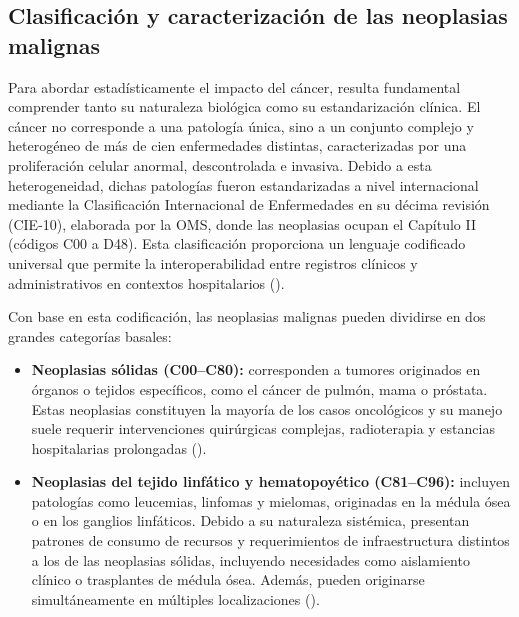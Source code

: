 

\subsection{Clasificación y caracterización de las neoplasias malignas}

Para abordar estadísticamente el impacto del cáncer, resulta fundamental comprender tanto su naturaleza biológica como su estandarización clínica. El cáncer no corresponde a una patología única, sino a un conjunto complejo y heterogéneo de más de cien enfermedades distintas, caracterizadas por una proliferación celular anormal, descontrolada e invasiva. Debido a esta heterogeneidad, dichas patologías fueron estandarizadas a nivel internacional mediante la Clasificación Internacional de Enfermedades en su décima revisión (CIE-10), elaborada por la OMS, donde las neoplasias ocupan el Capítulo II (códigos C00 a D48). Esta clasificación proporciona un lenguaje codificado universal que permite la interoperabilidad entre registros clínicos y administrativos en contextos hospitalarios (\cite{paho}).


Con base en esta codificación, las neoplasias malignas pueden dividirse en dos grandes categorías basales:

\begin{itemize}
	\item \textbf{Neoplasias sólidas (C00--C80):} corresponden a tumores originados en órganos o tejidos específicos, como el cáncer de pulmón, mama o próstata. Estas neoplasias constituyen la mayoría de los casos oncológicos y su manejo suele requerir intervenciones quirúrgicas complejas, radioterapia y estancias hospitalarias prolongadas (\cite{ministerio_salud}). 
	\item \textbf{Neoplasias del tejido linfático y hematopoyético (C81--C96):} incluyen patologías como leucemias, linfomas y mielomas, originadas en la médula ósea o en los ganglios linfáticos. Debido a su naturaleza sistémica, presentan patrones de consumo de recursos y requerimientos de infraestructura distintos a los de las neoplasias sólidas, incluyendo necesidades como aislamiento clínico o trasplantes de médula ósea. Además, pueden originarse simultáneamente en múltiples localizaciones (\cite{ministerio_salud}).
\end{itemize}

